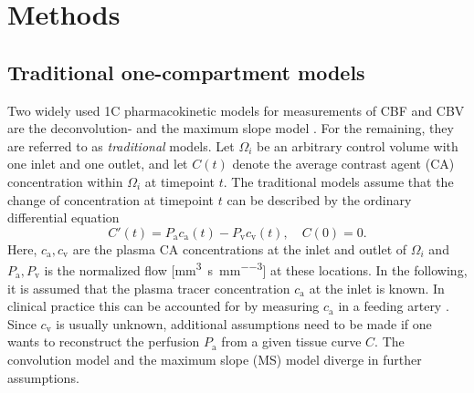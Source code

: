 \documentclass[final,5p,times,twocolumn]{elsarticle}
\begin{document}
	

	

	\section{Methods} 


	\subsection{Traditional one-compartment models}\label{sec:traditional}
	Two widely used 1C pharmacokinetic models for measurements of CBF and CBV  are the deconvolution- and the maximum slope model \cite{Feng2013,Chen2011,kudo10}.
	For the remaining, they are referred to as \emph{traditional} models.	Let $\Omega_i$ be an arbitrary control volume with one inlet and one outlet, and let $C(t)$ denote the average contrast agent (CA) concentration within $\Omega_i$ at timepoint $t$.
	The traditional models assume that the change of concentration at timepoint $t$ can be described by the ordinary differential equation 
	\begin{equation}\label{eq:classicgeneral}
		C'(t) = P_{\mathrm{a}}c_\mathrm{a}(t) - P_{\mathrm{v}}c_{\mathrm{v}}(t), \quad C(0) = 0.
	\end{equation}
	Here, $c_\mathrm{a},c_{\mathrm{v}}$ are the plasma CA concentrations at the inlet and outlet of $\Omega_i$ and $P_{\mathrm{a}},P_{\mathrm{v}}$ is the normalized flow [\si{\milli\meter\cubed\per\second\per\milli\meter\cubed}] at these locations.
	In the following, it is assumed that the plasma tracer concentration $c_\mathrm{a}$ at the inlet is known.
	In clinical practice this can be accounted for by measuring $c_\mathrm{a}$ in a feeding artery \cite{ostergaard96}.
	Since $c_{\mathrm{v}}$ is usually unknown, additional assumptions need to be made if one wants to reconstruct the perfusion $P_{\mathrm{a}}$ from a given tissue curve $C$. The convolution model and the maximum slope (MS) model diverge in further assumptions.
\end{document}
